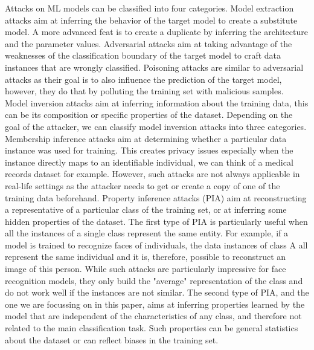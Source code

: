 \documentclass[11pt]{article}
\begin{document}
Attacks on ML models can be classified into four categories. Model extraction \cite{tramer2016stealing, papernot2017practical, wang2018stealing} attacks aim at inferring the behavior of the target model to create a substitute model. A more advanced feat is to create a duplicate by inferring the architecture and the parameter values. Adversarial attacks \cite{goodfellow2014explaining, szegedy2013intriguing} aim at taking advantage of the weaknesses of the classification boundary of the target model to craft data instances that are wrongly classified. Poisoning attacks \cite{mei2015using, jagielski2018manipulating} are similar to adversarial attacks as their goal is to also influence the prediction of the target model, however, they do that by polluting the training set with malicious samples. Model inversion attacks aim at inferring information about the training data, this can be its composition or specific properties of the dataset. 
Depending on the goal of the attacker, we can classify model inversion attacks into three categories. Membership inference attacks \cite{truex2018towards, hitaj2017deep} aim at determining whether a particular data instance was used for training. This creates privacy issues especially when the instance directly maps to an identifiable individual, we can think of a medical records dataset for example. However, such attacks are not always applicable in real-life settings as the attacker needs to get or create a copy of one of the training data beforehand. Property inference attacks \cite{Ateniese2015, Zhang2019, Melis2019} (PIA) aim at reconstructing a representative of a particular class of the training set, or at inferring some hidden properties of the dataset. The first type of PIA is particularly useful when all the instances of a single class represent the same entity. For example, if a model is trained to recognize faces of individuals, the data instances of class A all represent the same individual and it is, therefore, possible to reconstruct an image of this person. While such attacks are particularly impressive for face recognition models, they only build the "average" representation of the class and do not work well if the instances are not similar. The second type of PIA, and the one we are focussing on in this paper, aims at inferring properties learned by the model that are independent of the characteristics of any class, and therefore not related to the main classification task. Such properties can be general statistics about the dataset or can reflect biases in the training set. \\
\end{document}
